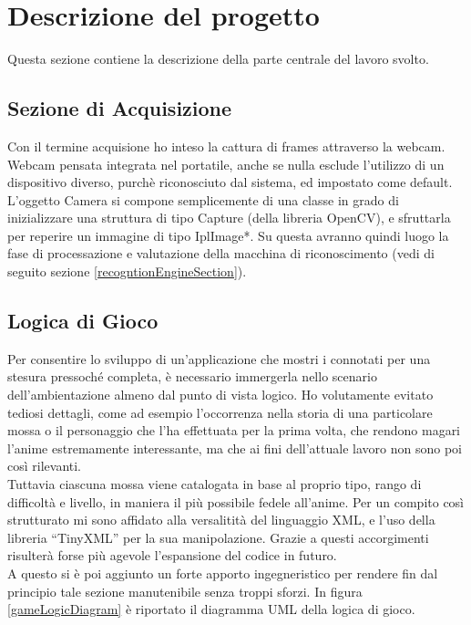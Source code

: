 \documentclass[a4paper,10pt, twocolumn]{article}
\begin{document}
  
\section{Descrizione del progetto}
Questa sezione contiene la descrizione della parte centrale del lavoro svolto.

  \subsection{Sezione di Acquisizione} 
  Con il termine acquisione ho inteso la cattura di frames attraverso la webcam.
  Webcam pensata integrata nel portatile, anche se nulla esclude 
  l'utilizzo di un dispositivo diverso, purch\`{e} riconosciuto dal sistema, ed
  impostato come default.\\
  L'oggetto Camera si compone semplicemente di una
  classe in grado di inizializzare una struttura di tipo Capture (della libreria OpenCV),
  e sfruttarla per reperire un immagine di tipo IplImage*. Su questa avranno quindi
  luogo la fase di processazione e valutazione della macchina di riconoscimento
  (vedi di seguito sezione \ref{recogntionEngineSection}).
  
  \subsection{Logica di Gioco}
  Per consentire lo sviluppo di un'applicazione che mostri i connotati per una stesura 
  pressoch\'{e}  completa, 
  \`{e} necessario immergerla nello scenario dell'ambientazione almeno dal punto 
  di vista logico. Ho volutamente evitato tediosi dettagli, come ad esempio l'occorrenza nella
  storia
  di una particolare mossa o il personaggio che l'ha effettuata per la prima volta,
  che rendono magari
  l'anime estremamente interessante, 
  ma che ai fini dell'attuale
  lavoro non sono poi cos\`{i} rilevanti.\\
  Tuttavia ciascuna mossa viene catalogata in base al proprio tipo, rango di difficolt\`{a} e 
  livello, in maniera il pi\`{u} possibile fedele all'anime. Per un compito cos\`{i}
  strutturato mi sono affidato alla versalitit\`{a} del linguaggio XML, e l'uso della libreria
  ``TinyXML'' \cite{tinyXml} per la sua manipolazione. Grazie a questi accorgimenti 
  risulter\`{a} forse pi\`{u} agevole l'espansione del codice in futuro.\\
  A questo si \`{e} poi aggiunto un forte apporto ingegneristico per rendere fin dal 
  principio tale sezione manutenibile senza troppi sforzi.
  In figura \ref{gameLogicDiagram} \`{e} riportato il diagramma UML della logica di gioco.
   
\end{document}
